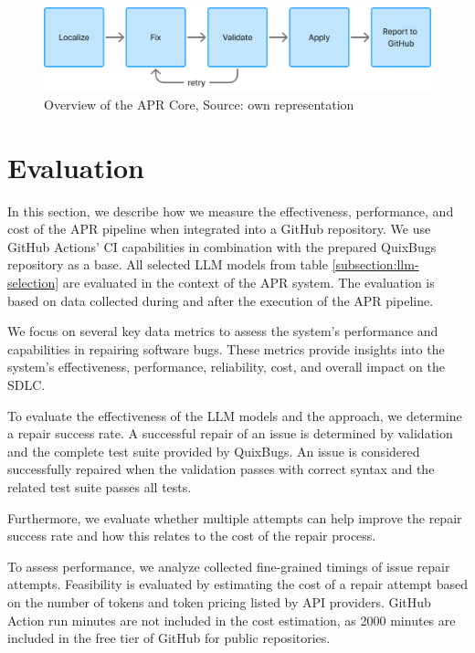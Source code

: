 \begin{figure}[H]
    \centering
    \includegraphics[width=1\textwidth]{images/flowcharts/apr_core_overview.png}
    \caption{Overview of the APR Core, Source: own representation}
    \label{fig:apr-core-overview}
\end{figure}



\section{Evaluation} \label{section:evaluation}
In this section, we describe how we measure the effectiveness, performance, and cost of the APR pipeline when integrated into a GitHub repository. We use GitHub Actions' \ac{CI} capabilities in combination with the prepared QuixBugs repository as a base. All selected LLM models from table \ref{subsection:llm-selection} are evaluated in the context of the APR system. The evaluation is based on data collected during and after the execution of the APR pipeline.

We focus on several key data metrics to assess the system's performance and capabilities in repairing software bugs. These metrics provide insights into the system's effectiveness, performance, reliability, cost, and overall impact on the \ac{SDLC}.

To evaluate the effectiveness of the LLM models and the approach, we determine a repair success rate. A successful repair of an issue is determined by validation and the complete test suite provided by QuixBugs. An issue is considered successfully repaired when the validation passes with correct syntax and the related test suite passes all tests.

Furthermore, we evaluate whether multiple attempts can help improve the repair success rate and how this relates to the cost of the repair process.

To assess performance, we analyze collected fine-grained timings of issue repair attempts. Feasibility is evaluated by estimating the cost of a repair attempt based on the number of tokens and token pricing listed by API providers. GitHub Action run minutes are not included in the cost estimation, as 2000 minutes are included in the free tier of GitHub for public repositories.

